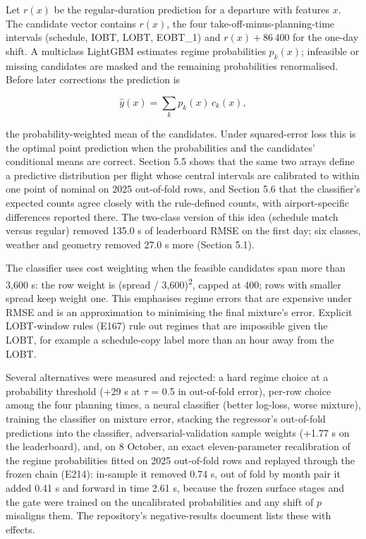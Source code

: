 \documentclass[
  manuscript=article,  %
  layout=preprint,     %
  year=2026,
  volume=4,
]{extra/joas}
\begin{document}
Let \(r(x)\) be the regular-duration prediction for a departure with features \(x\). The candidate vector contains \(r(x)\), the four take-off-minus-planning-time intervals (schedule, IOBT, LOBT, EOBT\_1) and \(r(x) + 86\,400\) for the one-day shift. A multiclass LightGBM \autocite{ke2017lightgbm} estimates regime probabilities \(p_k(x)\); infeasible or missing candidates are masked and the remaining probabilities renormalised. Before later corrections the prediction is

\begin{equation}\hat y(x) = \sum_k p_k(x)\, c_k(x),\end{equation}

the probability-weighted mean of the candidates. Under squared-error loss this is the optimal point prediction when the probabilities and the candidates' conditional means are correct. Section 5.5 shows that the same two arrays define a predictive distribution per flight whose central intervals are calibrated to within one point of nominal on 2025 out-of-fold rows, and Section 5.6 that the classifier's expected counts agree closely with the rule-defined counts, with airport-specific differences reported there. The two-class version of this idea (schedule match versus regular) removed 135.0 s of leaderboard RMSE on the first day; six classes, weather and geometry removed 27.0 s more (Section 5.1).

The classifier uses cost weighting when the feasible candidates span more than 3,600 s: the row weight is (spread / 3,600)\textsuperscript{2}, capped at 400; rows with smaller spread keep weight one. This emphasises regime errors that are expensive under RMSE and is an approximation to minimising the final mixture's error. Explicit LOBT-window rules (E167) rule out regimes that are impossible given the LOBT, for example a schedule-copy label more than an hour away from the LOBT.

Several alternatives were measured and rejected: a hard regime choice at a probability threshold (+29 s at $\tau$ = 0.5 in out-of-fold error), per-row choice among the four planning times, a neural classifier (better log-loss, worse mixture), training the classifier on mixture error, stacking the regressor's out-of-fold predictions into the classifier, adversarial-validation sample weights (+1.77 s on the leaderboard), and, on 8 October, an exact eleven-parameter recalibration of the regime probabilities fitted on 2025 out-of-fold rows and replayed through the frozen chain (E214): in-sample it removed 0.74 s, out of fold by month pair it added 0.41 s and forward in time 2.61 s, because the frozen surface stages and the gate were trained on the uncalibrated probabilities and any shift of \(p\) misaligns them. The repository's negative-results document lists these with effects.
\end{document}
